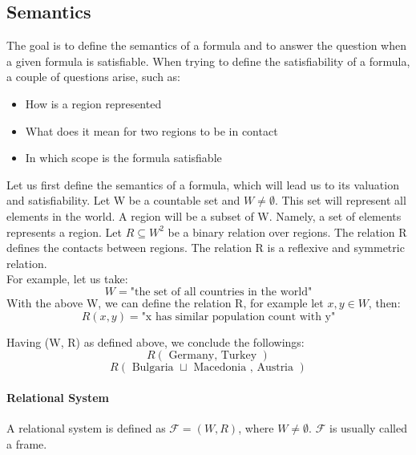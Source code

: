 \documentclass{article}
\begin{document}
	\subsection{Semantics}
The goal is to define the semantics of a formula and to answer the question when a given formula is satisfiable.
When trying to define the satisfiability of a formula, a couple of questions arise, such as:
		\begin{itemize}
			\item How is a region represented 
			\item What does it mean for two regions to be in contact
			\item In which scope is the formula satisfiable
		\end{itemize}
Let us first define the semantics of a formula, which will lead us to its valuation and satisfiability.
\newline
Let W be a countable set and $W \neq \emptyset$. This set will represent all elements in the world.
A region will be a subset of W. Namely, a set of elements represents a region.
Let $R \subseteq W^2$ be a binary relation over regions. The relation R defines the contacts between regions.
The relation R is a reflexive and symmetric relation. \\
For example, let us take:
		\begin{equation*}
			W = \text{"the set of all countries in the world"}
		\end{equation*}
With the above W, we can define the relation R, for example let $x, y \in W$, then:
		\begin{equation*}
			R(x,y) = \text{"x has similar population count with y"}
		\end{equation*}

Having (W, R) as defined above, we conclude the followings: 
		\begin{equation*}
			R(\text{ Germany, Turkey })
		 \end{equation*}
		\begin{equation*}
			R(\text{ Bulgaria } \sqcup \text{ Macedonia , Austria })
		 \end{equation*}
	\paragraph{Relational System} A relational system is defined as $\mathcal{F} = (W, R)$, where $W \neq \emptyset$. $\mathcal{F}$ is usually called a frame.
\end{document}
